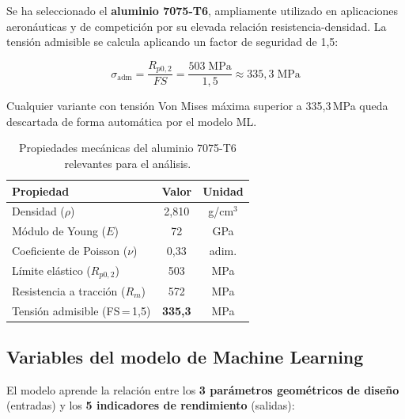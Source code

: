 \documentclass[11pt, a4paper]{article}
\begin{document}
Se ha seleccionado el \textbf{aluminio 7075-T6}, ampliamente utilizado en aplicaciones
aeronáuticas y de competición por su elevada relación resistencia-densidad. La tensión
admisible se calcula aplicando un factor de seguridad de 1{,}5:

\begin{equation}
  \sigma_{\text{adm}} = \frac{R_{p0{,}2}}{FS} = \frac{503\;\text{MPa}}{1{,}5} \approx 335{,}3\;\text{MPa}
  \label{eq:sigma_adm}
\end{equation}

Cualquier variante con tensión Von Mises máxima superior a 335{,}3\,MPa queda
descartada de forma automática por el modelo ML.

\begin{table}[H]
\centering
\caption{Propiedades mecánicas del aluminio 7075-T6 relevantes para el análisis.}
\label{tab:material}
\begin{tabular}{@{} l c c @{}}
  \toprule
  \textbf{Propiedad}                  & \textbf{Valor}    & \textbf{Unidad} \\
  \midrule
  Densidad ($\rho$)                   & 2{,}810           & g/cm$^3$  \\
  Módulo de Young ($E$)               & 72                & GPa       \\
  Coeficiente de Poisson ($\nu$)      & 0{,}33            & adim.     \\
  Límite elástico ($R_{p0{,}2}$)      & 503               & MPa       \\
  Resistencia a tracción ($R_m$)      & 572               & MPa       \\
  Tensión admisible (FS\,=\,1{,}5)    & \textbf{335{,}3}  & MPa       \\
  \bottomrule
\end{tabular}
\end{table}

\subsection{Variables del modelo de Machine Learning}

El modelo aprende la relación entre los \textbf{3 parámetros geométricos de diseño}
(entradas) y los \textbf{5 indicadores de rendimiento} (salidas):
\end{document}
